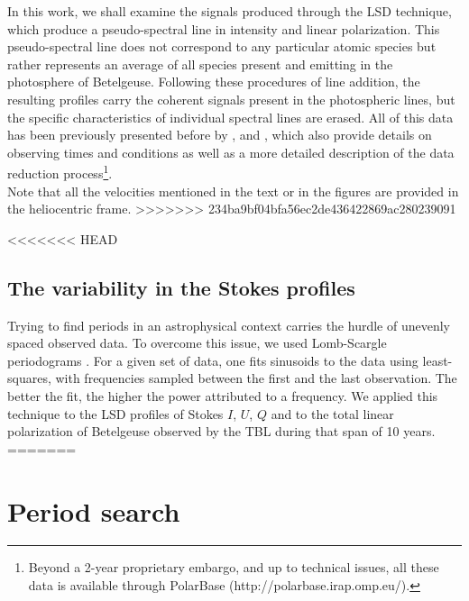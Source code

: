 \documentclass{aa}
\begin{document}
In this work, we shall examine the signals produced through the LSD technique, which produce a pseudo-spectral line in intensity 
and linear polarization. This pseudo-spectral line does not correspond to any particular atomic species but rather represents an average of all species present and emitting in the 
photosphere of Betelgeuse. Following these procedures of line addition, the resulting profiles carry the coherent signals present in the photospheric lines, but the specific characteristics of individual spectral lines are erased. All of this data has been previously presented before by \cite{auriere_discovery_2016}, \cite{mathias_evolution_2018} and 
\cite{lopez_ariste_three-dimensional_2022}, which also provide details on observing times and conditions as well as a more detailed description 
of the data reduction process\footnote[2]{Beyond a 2-year proprietary embargo, and up to technical issues, all these data is available through 
PolarBase (http://polarbase.irap.omp.eu/).}.\\
Note that all the velocities mentioned in the text or in the figures are provided in the heliocentric frame.
>>>>>>> 234ba9bf04bfa56ec2de436422869ac280239091




<<<<<<< HEAD
\subsection{The variability in the Stokes profiles}


Trying to find periods in an astrophysical context carries the hurdle of unevenly spaced observed data. To overcome this issue, 
we used  Lomb-Scargle periodograms \citep{lomb_least-squares_1976,scargle_studies_1982}. For a given set of data, one fits sinusoids to the data
using least-squares, with frequencies sampled between the first and the last observation. The better the fit, the higher the power attributed to a frequency. 
We applied this technique to the  LSD profiles of Stokes $I$, $U$, $Q$ and to the total linear polarization of Betelgeuse observed by the TBL during 
that span of 10 years. 
=======
\section{Period search}
\label{section 3}
\end{document}
